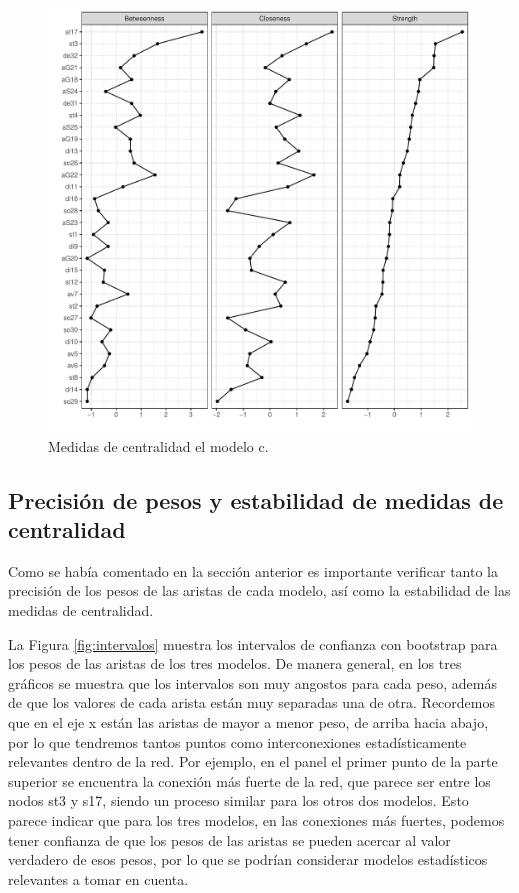 \documentclass[11pt,spanish]{article}\usepackage[]{graphicx}\usepackage[]{color}
\begin{document}
\begin{figure}[ht!]
\centering
\includegraphics[scale=0.8]{images/centrality_net_todo.pdf}
\caption{Medidas de centralidad el modelo c.}
\label{fig:centra_todos}
\end{figure}

\clearpage

\newpage

\subsection{Precisión de pesos y estabilidad de medidas de centralidad}

Como se había comentado en la sección anterior es importante verificar tanto la precisión de los pesos de las aristas de cada modelo, así como la estabilidad de las medidas de centralidad. 

La Figura \ref{fig:intervalos} muestra los intervalos de confianza con bootstrap para los pesos de las aristas de los tres modelos. De manera general, en los tres gráficos se muestra que los intervalos son muy angostos para cada peso, además de que los valores de cada arista están muy separadas una de otra. Recordemos que en el eje x están las aristas de mayor a menor peso, de arriba hacia abajo, por lo que tendremos tantos puntos como interconexiones estadísticamente relevantes dentro de la red. Por ejemplo, en el panel el primer punto de la parte superior se encuentra la conexión más fuerte de la red, que parece ser entre los nodos st3 y s17, siendo un proceso similar para los otros dos modelos. Esto parece indicar que para los tres modelos, en las conexiones más fuertes, podemos tener confianza de que los pesos de las aristas se pueden acercar al valor verdadero de esos pesos, por lo que se podrían considerar modelos estadísticos relevantes a tomar en cuenta.
\end{document}
